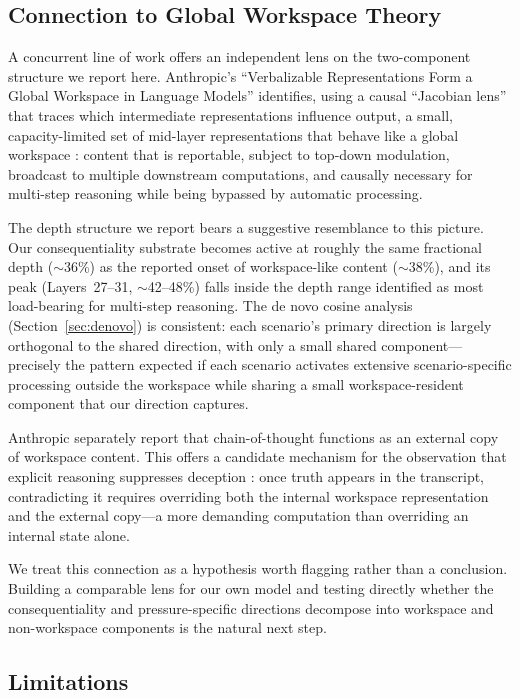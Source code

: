 \documentclass[11pt,letterpaper]{article}
\begin{document}
\subsection{Connection to Global Workspace Theory}\label{sec:workspace}

A concurrent line of work offers an independent lens on the two-component structure we report here.
Anthropic's ``Verbalizable Representations Form a Global Workspace in Language Models''
\cite{anthropic2026workspace} identifies, using a causal ``Jacobian lens'' that traces which
intermediate representations influence output, a small, capacity-limited set of mid-layer
representations that behave like a global workspace \cite{baars1988cognitive}: content that is
reportable, subject to top-down modulation, broadcast to multiple downstream computations, and
causally necessary for multi-step reasoning while being bypassed by automatic processing.

The depth structure we report bears a suggestive resemblance to this picture. Our consequentiality
substrate becomes active at roughly the same fractional depth ($\sim$36\%) as the reported onset of
workspace-like content ($\sim$38\%), and its peak (Layers~27--31, $\sim$42--48\%) falls inside the
depth range identified as most load-bearing for multi-step reasoning. The de novo cosine analysis
(Section~\ref{sec:denovo}) is consistent: each scenario's primary direction is largely
orthogonal to the shared direction, with only a small shared component---precisely the pattern
expected if each scenario activates extensive scenario-specific processing outside the workspace while
sharing a small workspace-resident component that our direction captures.

Anthropic separately report that chain-of-thought functions as an external copy of workspace content.
This offers a candidate mechanism for the observation that explicit reasoning suppresses deception
\cite{cc2026targeted}: once truth appears in the transcript, contradicting it requires overriding
both the internal workspace representation and the external copy---a more demanding computation than
overriding an internal state alone.

We treat this connection as a hypothesis worth flagging rather than a conclusion. Building a
comparable lens for our own model and testing directly whether the consequentiality and pressure-specific
directions decompose into workspace and non-workspace components is the natural next step.

\subsection{Limitations}
\end{document}
